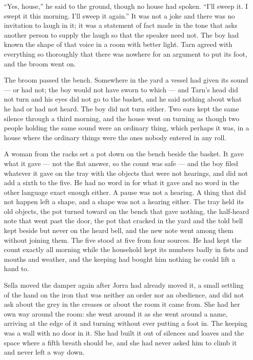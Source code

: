 “Yes, house,” he said to the ground, though no house had spoken. “I'll sweep it. I swept it this morning. I'll sweep it again.” It was not a joke and there was no invitation to laugh in it; it was a statement of fact made in the tone that asks another person to supply the laugh so that the speaker need not. The boy had known the shape of that voice in a room with better light. Tarn agreed with everything so thoroughly that there was nowhere for an argument to put its foot, and the broom went on.

The broom passed the bench. Somewhere in the yard a vessel had given its sound --- or had not; the boy would not have sworn to which --- and Tarn's head did not turn and his eyes did not go to the basket, and he said nothing about what he had or had not heard. The boy did not turn either. Two ears kept the same silence through a third morning, and the house went on turning as though two people holding the same sound were an ordinary thing, which perhaps it was, in a house where the ordinary things were the ones nobody entered in any roll.

A woman from the racks set a pot down on the bench beside the basket. It gave what it gave --- not the flat answer, so the count was safe --- and the boy filed whatever it gave on the tray with the objects that were not hearings, and did not add a sixth to the five. He had no word in  for what it gave and no word in the other language exact enough either. A pause was not a hearing. A thing that did not happen left a shape, and a shape was not a hearing either. The tray held its old objects, the pot turned toward on the bench that gave nothing, the half-heard note that went past the door, the pot that cracked in the yard and the told bell kept beside but never on the heard bell, and the new note went among them without joining them. The five stood at five from four sources. He had kept the count exactly all morning while the household kept its numbers badly in fists and mouths and weather, and the keeping had bought him nothing he could lift a hand to.

\scenebreak

Sella moved the damper again after Jorra had already moved it, a small settling of the hand on the iron that was neither an order nor an obedience, and did not ask about the grey in the creases or about the room it came from. She had her own way around the room: she went around it as she went around a name, arriving at the edge of it and turning without ever putting a foot in. The keeping was a wall with no door in it. She had built it out of silences and loaves and the space where a fifth breath should be, and she had never asked him to climb it and never left a way down.

